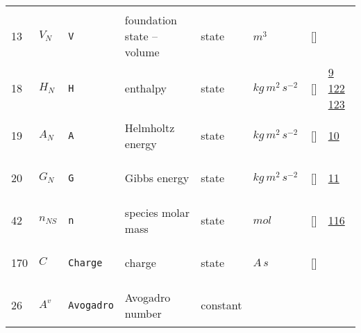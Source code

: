 \begin{longtable}{|p{1cm}|p{3cm}|p{3cm}|p{7cm}|p{3.0cm}|p{3cm}|p{2cm}|p{1cm}|}
             & \\
    13
             & \hypertarget{"v:13"}{ $ {V}{_{N}} $}
             & \verb|V|
             & foundation state -- volume
             & \begin{lay}state \end{lay}
             & $ m^{3} \, $
             & []
             & \\
    18
             & \hypertarget{"v:18"}{ $ {H}{_{N}} $}
             & \verb|H|
             & enthalpy
             & \begin{lay}state \end{lay}
             & $ kg \,m^{2} \,s^{-2} \, $
             & []
             & \hyperlink{"e:9"}{ 9 }
                 \hyperlink{"e:122"}{ 122 }
                 \hyperlink{"e:123"}{ 123 }
                 \\
    19
             & \hypertarget{"v:19"}{ $ {A}{_{N}} $}
             & \verb|A|
             & Helmholtz energy
             & \begin{lay}state \end{lay}
             & $ kg \,m^{2} \,s^{-2} \, $
             & []
             & \hyperlink{"e:10"}{ 10 }
                 \\
    20
             & \hypertarget{"v:20"}{ $ {G}{_{N}} $}
             & \verb|G|
             & Gibbs energy
             & \begin{lay}state \end{lay}
             & $ kg \,m^{2} \,s^{-2} \, $
             & []
             & \hyperlink{"e:11"}{ 11 }
                 \\
    42
             & \hypertarget{"v:42"}{ $ {n}{_{{N S}}} $}
             & \verb|n|
             & species molar mass
             & \begin{lay}state \end{lay}
             & $ mol \, $
             & []
             & \hyperlink{"e:116"}{ 116 }
                 \\
    170
             & \hypertarget{"v:170"}{ $ {C}{_{}} $}
             & \verb|Charge|
             & charge
             & \begin{lay}state \end{lay}
             & $ A \,s \, $
             & []
             & \\
    26
             & \hypertarget{"v:26"}{ $ {A^v}{_{}} $}
             & \verb|Avogadro|
             & Avogadro number
             & \begin{lay}constant \end{lay}

\end{longtable}
